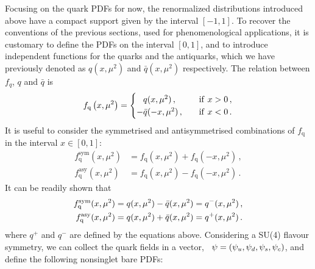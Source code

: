 Focusing on the quark PDFs for now, the renormalized distributions introduced
above have a compact support given by the interval $[-1,1]$. 
To recover the conventions of the previous sections, used for
phenomenological applications, it is customary to define the PDFs on the
interval $[0,1]$, and to introduce independent functions for the quarks and the
antiquarks, which we have previously denoted as $q(x,\mu^2)$ and $\bar{q}(x,\mu^2)$ respectively.
The relation between $f_q$, $q$ and $\bar{q}$ is 
\begin{equation}
    \label{eq:DefFQQbar}
    f_\mathrm{q}\left( x,\mu^2\right) = 
    \begin{cases}
        \phantom{-}q(x,\mu^2)\, , &\quad \mathrm{if}\ x>0\, , \\
        -\bar{q}(-x,\mu^2)\, , &\quad \mathrm{if}\ x<0 \, .
    \end{cases}
\end{equation}
It is useful to consider the symmetrised and antisymmetrised combinations of
$f_\mathrm{q}$ in the interval $x\in[0,1]$:
\begin{eqnarray}
	\label{eq:fsym}
	f^\mathrm{sym}_\mathrm{q}(x,\mu^2)  &= f_\mathrm{q}(x,\mu^2) + f_\mathrm{q}(-x,\mu^2) 
	\, , \\
	\label{eq:fasym}
	f^\mathrm{asy}_\mathrm{q}(x,\mu^2)  &= f_\mathrm{q}(x,\mu^2) - f_\mathrm{q}(-x,\mu^2) \, .
\end{eqnarray}
It can be readily shown that
\begin{align}
    f^{\mathrm{sym}}_\mathrm{q}(x,\mu^2) &= 
    q(x,\mu^2) - \bar{q}(x,\mu^2) = q^-(x,\mu^2) \, , \\
    f^{\mathrm{asy}}_\mathrm{q}(x,\mu^2) &= 
    q(x,\mu^2) + \bar{q}(x,\mu^2) = q^+(x,\mu^2) \, .
\end{align}
where $q^+$ and $q^-$ are defined by the equations above. 
Considering a SU(4) flavour symmetry, we can collect the quark fields in a vector, \eg\
$\psi = \left( \psi_u,\psi_d,\psi_s,\psi_c\right)$, and define the following nonsinglet bare
PDFs:
